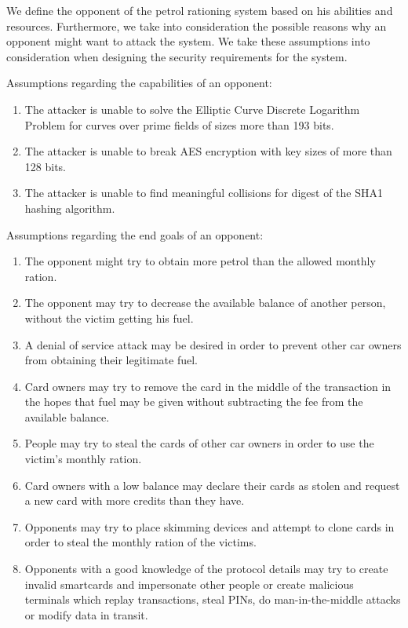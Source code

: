 We define the opponent of the petrol rationing system based on his abilities and resources. Furthermore, we take into consideration the possible reasons why an opponent might want to attack the system. We take these assumptions into consideration when designing the security requirements for the system.

Assumptions regarding the capabilities of an opponent:
\begin{enumerate}
	\item The attacker is unable to solve the Elliptic Curve Discrete Logarithm Problem for curves over prime fields of sizes more than 193 bits.
	\item The attacker is unable to break AES encryption with key sizes of more than 128 bits.
	\item The attacker is unable to find meaningful collisions for digest of the SHA1 hashing algorithm.
\end{enumerate}

Assumptions regarding the end goals of an opponent:
\begin{enumerate}
	\item The opponent might try to obtain more petrol than the allowed monthly ration.
	\item The opponent may try to decrease the available balance of another person, without the victim getting his fuel.
	\item A denial of service attack may be desired in order to prevent other car owners from obtaining their legitimate fuel.
	\item Card owners may try to remove the card in the middle of the transaction in the hopes that fuel may be given without subtracting the fee from the available balance.
	\item People may try to steal the cards of other car owners in order to use the victim's monthly ration.
	\item Card owners with a low balance may declare their cards as stolen and request a new card with more credits than they have.
	\item Opponents may try to place skimming devices and attempt to clone cards in order to steal the monthly ration of the victims.
	\item Opponents with a good knowledge of the protocol details may try to create invalid smartcards and impersonate other people or create malicious terminals which replay transactions, steal PINs, do man-in-the-middle attacks or modify data in transit.
\end{enumerate}